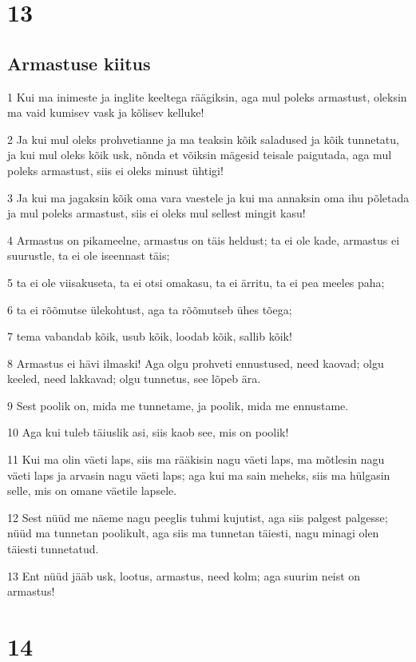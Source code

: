 \chapter{13}

\section*{Armastuse kiitus}

\par 1 Kui ma inimeste ja inglite keeltega räägiksin, aga mul poleks armastust, oleksin ma vaid kumisev vask ja kõlisev kelluke!
\par 2 Ja kui mul oleks prohvetianne ja ma teaksin kõik saladused ja kõik tunnetatu, ja kui mul oleks kõik usk, nõnda et võiksin mägesid teisale paigutada, aga mul poleks armastust, siis ei oleks minust ühtigi!
\par 3 Ja kui ma jagaksin kõik oma vara vaestele ja kui ma annaksin oma ihu põletada ja mul poleks armastust, siis ei oleks mul sellest mingit kasu!
\par 4 Armastus on pikameelne, armastus on täis heldust; ta ei ole kade, armastus ei suurustle, ta ei ole iseennast täis;
\par 5 ta ei ole viisakuseta, ta ei otsi omakasu, ta ei ärritu, ta ei pea meeles paha;
\par 6 ta ei rõõmutse ülekohtust, aga ta rõõmutseb ühes tõega;
\par 7 tema vabandab kõik, usub kõik, loodab kõik, sallib kõik!
\par 8 Armastus ei hävi ilmaski! Aga olgu prohveti ennustused, need kaovad; olgu keeled, need lakkavad; olgu tunnetus, see lõpeb ära.
\par 9 Sest poolik on, mida me tunnetame, ja poolik, mida me ennustame.
\par 10 Aga kui tuleb täiuslik asi, siis kaob see, mis on poolik!
\par 11 Kui ma olin väeti laps, siis ma rääkisin nagu väeti laps, ma mõtlesin nagu väeti laps ja arvasin nagu väeti laps; aga kui ma sain meheks, siis ma hülgasin selle, mis on omane väetile lapsele.
\par 12 Sest nüüd me näeme nagu peeglis tuhmi kujutist, aga siis palgest palgesse; nüüd ma tunnetan poolikult, aga siis ma tunnetan täiesti, nagu minagi olen täiesti tunnetatud.
\par 13 Ent nüüd jääb usk, lootus, armastus, need kolm; aga suurim neist on armastus!


\chapter{14}

